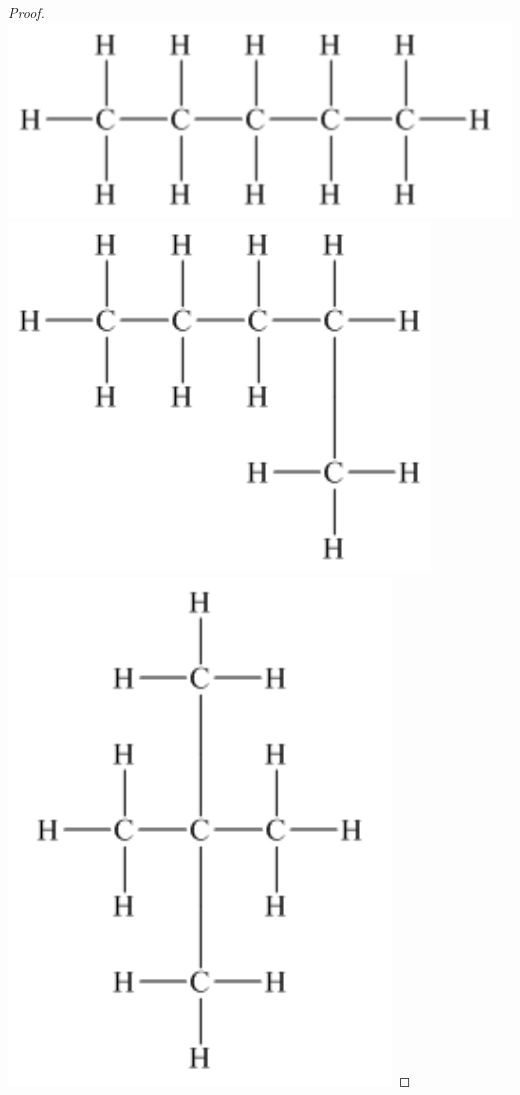\documentclass[14pt]{extarticle}
\begin{document}
\begin{proof}
    \includegraphics[scale=0.3]{../images/10.4.4.b.1.png}
    \includegraphics[scale=0.3]{../images/10.4.4.b.2.png}
    \includegraphics[scale=0.3]{../images/10.4.4.b.3.png}
\end{proof}
\end{document}
